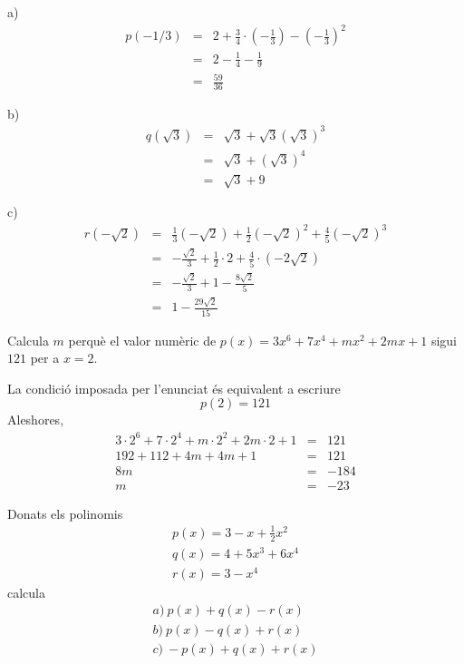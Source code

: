 \begin{solucio}
a)
\begin{eqnarray*}
p(-1/3) &=&2+\frac{3}{4}\cdot \left( -\frac{1}{3}\right) -\left( -\frac{1}{3}\right) ^{2} \\
&=&2-\frac{1}{4}-\frac{1}{9} \\
&=&\frac{59}{36}
\end{eqnarray*}

b)\begin{eqnarray*}
q(\sqrt{3}) &=&\sqrt{3}+\sqrt{3}\left( \sqrt{3}\right) ^{3} \\
&=&\sqrt{3}+\left( \sqrt{3}\right) ^{4} \\
&=&\sqrt{3}+9
\end{eqnarray*}

c)\begin{eqnarray*}
r(-\sqrt{2}) &=&\frac{1}{3}\left( -\sqrt{2}\right) +\frac{1}{2}\left( -\sqrt{2}\right) ^{2}+\frac{4}{5}\left( -\sqrt{2}\right) ^{3} \\
&=&-\frac{\sqrt{2}}{3}+\frac{1}{2}\cdot 2+\frac{4}{5}\cdot \left( -2\sqrt{2}\right) \\
&=&-\frac{\sqrt{2}}{3}+1-\frac{8\sqrt{2}}{5} \\
&=&1-\frac{29\sqrt{2}}{15}
\end{eqnarray*}
\end{solucio}

\begin{exercici}
Calcula $m$ perquè el valor numèric de $p(x)=3x^{6}+7x^{4}+mx^{2}+2mx+1$ sigui $121$ per a $x=2$.
\end{exercici}

\begin{solucio}
La condició imposada per l’enunciat és equivalent a escriure\[
p(2)=121
\]Aleshores,\begin{eqnarray*}
3\cdot 2^{6}+7\cdot 2^{4}+m\cdot 2^{2}+2m\cdot 2+1 &=&121 \\
192+112+4m+4m+1 &=&121 \\
8m &=&-184 \\
m &=&-23
\end{eqnarray*}
\end{solucio}

\begin{exercici}
Donats els polinomis\[
\begin{array}{l}
p(x)=3-x+\frac{1}{2}x^{2} \\
q(x)=4+5x^{3}+6x^{4} \\
r(x)=3-x^{4}\end{array}\]calcula\[
\begin{array}{l}
a)~p(x)+q(x)-r(x) \\
b)~p(x)-q(x)+r(x) \\
c)~-p(x)+q(x)+r(x)\end{array}\]
\end{exercici}

